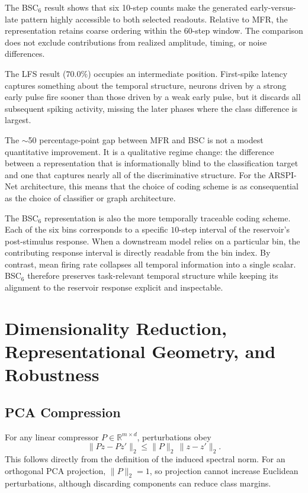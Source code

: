 The BSC$_6$ result shows that six 10-step counts make the generated early-versus-late pattern highly accessible to both selected readouts. Relative to MFR, the representation retains coarse ordering within the 60-step window. The comparison does not exclude contributions from realized amplitude, timing, or noise differences.

The LFS result ($70.0\%$) occupies an intermediate position. First-spike latency captures something about the temporal structure, neurons driven by a strong early pulse fire sooner than those driven by a weak early pulse, but it discards all subsequent spiking activity, missing the later phases where the class difference is largest.

The $\sim$50 percentage-point gap between MFR and BSC is not a modest quantitative improvement. It is a qualitative regime change: the difference between a representation that is informationally blind to the classification target and one that captures nearly all of the discriminative structure. For the ARSPI-Net architecture, this means that the choice of coding scheme is as consequential as the choice of classifier or graph architecture.

The BSC$_6$ representation is also the more temporally traceable coding scheme. Each of the six bins corresponds to a specific $10$-step interval of the reservoir's post-stimulus response. When a downstream model relies on a particular bin, the contributing response interval is directly readable from the bin index. By contrast, mean firing rate collapses all temporal information into a single scalar. BSC$_6$ therefore preserves task-relevant temporal structure while keeping its alignment to the reservoir response explicit and inspectable.


\section{Dimensionality Reduction, Representational Geometry, and Robustness}
\label{sec:pca_robustness}

\subsection{PCA Compression}

For any linear compressor $P\in\mathbb{R}^{m\times d}$, perturbations obey
\begin{equation}
\|Pz-Pz'\|_2\le \|P\|_2\,\|z-z'\|_2.
\label{eq:linear_compressor_stability}
\end{equation}
This follows directly from the definition of the induced spectral norm. For an
orthogonal PCA projection, $\|P\|_2=1$, so projection cannot increase Euclidean
perturbations, although discarding components can reduce class margins.

